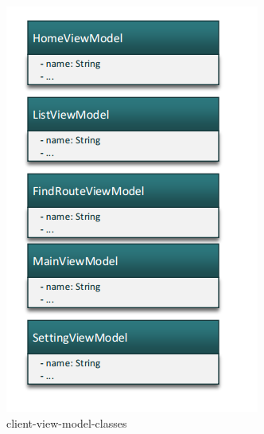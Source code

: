 			\begin{figure}[H]
				\centering
				\includegraphics[scale=0.7]{Chapters/Fig/client-view-model-classes.png}
				\caption{client-view-model-classes}
				\label{fig:architecture-of-webservice}
			\end{figure}
